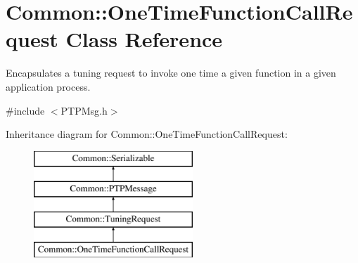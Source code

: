 \hypertarget{class_common_1_1_one_time_function_call_request}{\section{Common\-:\-:One\-Time\-Function\-Call\-Request Class Reference}
\label{class_common_1_1_one_time_function_call_request}
}


Encapsulates a tuning request to invoke one time a given function in a given application process.  




{\ttfamily \#include $<$P\-T\-P\-Msg.\-h$>$}

Inheritance diagram for Common\-:\-:One\-Time\-Function\-Call\-Request\-:\begin{figure}[H]
\begin{center}
\leavevmode
\includegraphics[height=4.000000cm]{class_common_1_1_one_time_function_call_request}
\end{center}
\end{figure}
